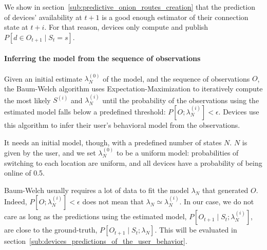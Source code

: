 We show in section~\ref{sub:predictive_onion_routes_creation} that the prediction of devices' availability at $t+1$ is a good enough estimator of their connection state at $t+i$.
For that reason, devices only compute and publish $P\left[ d \in O_{t+1} \mid S_{t} = s \right]$.


\paragraph*{Inferring the model from the sequence of observations}

Given an initial estimate $\lambda_{N}^{(0)}$ of the model, and the sequence of observations $O$, the Baum-Welch algorithm uses Expectation-Maximization to iteratively compute the most likely $S^{(i)}$ and $\lambda_{N}^{(i)}$ until the probability of the observations using the estimated model falls below a predefined threshold: $P[O; \lambda_{N}^{(i)}] < \epsilon$.
Devices use this algorithm to infer their user's behavioral model from the observations.

It needs an initial model, though, with a predefined number of states $N$. 
$N$ is given by the user, and we set $\lambda_{N}^{(0)}$ to be a uniform model: probabilities of switching to each location are uniform, and all devices have a probability of being online of 0.5.

Baum-Welch usually requires a lot of data to fit the model $\lambda_N$ that generated $O$.
Indeed, $P[O; \lambda_{N}^{(i)}] < \epsilon$ does not mean that $\lambda_N \simeq \lambda_N^{(i)}$.
In our case, we do not care as long as the predictions using the estimated model, $P[O_{t+1} \mid S_t; \lambda_N^{(i)}]$, are close to the ground-truth, $P[O_{t+1} \mid S_t; \lambda_N]$.
This will be evaluated in section~\ref{sub:devices_predictions_of_the_user_behavior}.
